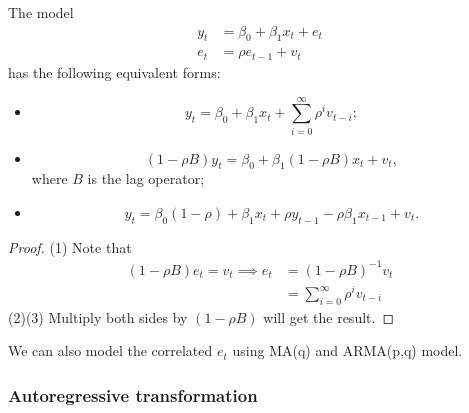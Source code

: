 \begin{refsection}
\begin{remark}

\end{remark}


\begin{lemma}\cite[361]{hill2010principles}
The model 	
\begin{align*}
y_t &= \beta_0 + \beta_1 x_t + e_t \\
e_t & = \rho e_{t-1} + v_t
\end{align*}
has the following equivalent forms:
\begin{itemize}
	\item $$y_t = \beta_0 + \beta_1 x_t + \sum_{i=0}^\infty \rho^i v_{t-i};$$
	\item $$(1 - \rho B)y_t = \beta_0 + \beta_1(1 - \rho B) x_t  + v_t,$$
	where $B$ is the lag operator;
	\item $$y_t = \beta_0(1 - \rho) + \beta_1 x_t + \rho y_{t-1} - \rho \beta_1 x_{t-1} + v_t.$$
\end{itemize} 
\end{lemma}
\begin{proof}
	(1) Note that 
\begin{align*}
	(1 - \rho B) e_t= v_t \implies e_t  &=(1 - \rho B)^{-1} v_t \\
	& =  \sum_{i=0}^\infty \rho^i v_{t-i}
\end{align*}
(2)(3) Multiply both sides by $(1 - \rho B)$ will get the result.	
\end{proof}


\begin{remark}
We can also model the correlated $e_t$ using MA(q) and ARMA(p,q) model.	
\end{remark}


\subsubsection{Autoregressive transformation}

\begin{lemma}\cite[254]{theil1971principles}


\end{lemma}
\end{refsection}
